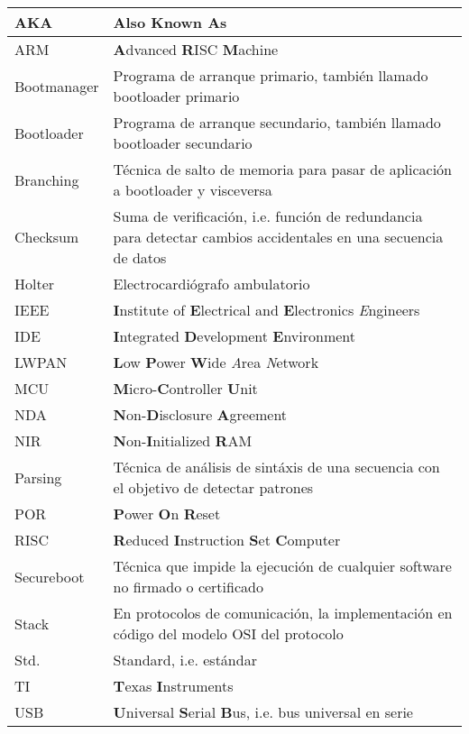 \documentclass[12pt,a4paper]{article}
\begin{document}
\begin{table}[ht]
\label{tab:glossary}
	\centering
	\begin{tabularx}{\linewidth}{@{}|>{\columncolor[gray]{0.8}}l|X|@{}}
	\hline
	AKA    			& \textbf{A}lso \textbf{K}nown \textbf{A}s																			\\ \hline
	ARM     		& \textbf{A}dvanced \textbf{R}ISC \textbf{M}achine	     															\\ \hline	
	Bootmanager     & Programa de arranque primario, también llamado bootloader primario												\\ \hline
	Bootloader      & Programa de arranque secundario, también llamado bootloader secundario											\\ \hline
	Branching     	& Técnica de salto de memoria para pasar de aplicación a bootloader y visceversa									\\ \hline
	Checksum     	& Suma de verificación, i.e. función de redundancia para detectar cambios accidentales en una secuencia de datos 	\\ \hline
	Holter     		& Electrocardiógrafo ambulatorio     																				\\ \hline
	IEEE     		& \textbf{I}nstitute of \textbf{E}lectrical and \textbf{E}lectronics \textit{E}ngineers								\\ \hline
	IDE     		& \textbf{I}ntegrated \textbf{D}evelopment \textbf{E}nvironment														\\ \hline
	LWPAN     		& \textbf{L}ow \textbf{P}ower \textbf{W}ide \textit{A}rea \textit{N}etwork											\\ \hline
	MCU     		& \textbf{M}icro-\textbf{C}ontroller \textbf{U}nit																	\\ \hline
	NDA     		& \textbf{N}on-\textbf{D}isclosure \textbf{A}greement																\\ \hline
	NIR     		& \textbf{N}on-\textbf{I}nitialized \textbf{R}AM	
								\\ \hline
	Parsing    		& Técnica de análisis de sintáxis de una secuencia con el objetivo de detectar patrones								\\ \hline
	POR     		& \textbf{P}ower \textbf{O}n \textbf{R}eset	
								\\ \hline
	RISC			& \textbf{R}educed \textbf{I}nstruction \textbf{S}et \textbf{C}omputer												\\ \hline
	Secureboot     	& Técnica que impide la ejecución de cualquier software no firmado o certificado									\\ \hline
	Stack	     	& En protocolos de comunicación, la implementación en código del modelo OSI del protocolo							\\ \hline
	Std.     		& Standard, i.e. estándar							     															\\ \hline
	TI       		& \textbf{T}exas \textbf{I}nstruments				     															\\ \hline
	USB     		& \textbf{U}niversal \textbf{S}erial \textbf{B}us, i.e. bus universal en serie										\\ \hline
	\end{tabularx}
\end{table}
\end{document}
